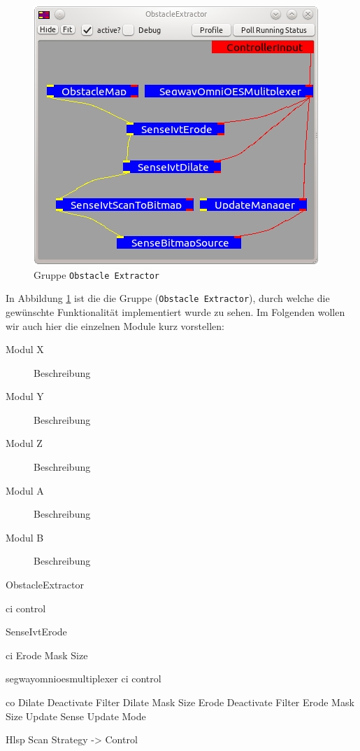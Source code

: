 \begin{figure}[h]
\center
\includegraphics[scale=0.8]{graphics/ObstacleExtractor.jpg}
\caption{\label{fig:obstacleExtractor} Gruppe \lstinline{Obstacle Extractor}}
\end{figure}
 In Abbildung \ref{fig:obstacleExtractor} ist die die Gruppe
 (\lstinline{Obstacle Extractor}), durch welche die gewünschte Funktionalität implementiert wurde zu sehen.
 Im Folgenden wollen wir auch hier die einzelnen Module kurz vorstellen:


\begin{description}
\item[Modul X] Beschreibung
\item[Modul Y] Beschreibung
\item[Modul Z] Beschreibung
\item[Modul A] Beschreibung
\item[Modul B] Beschreibung
\end{description}
ObstacleExtractor

ci control


SenseIvtErode

ci Erode Mask Size


segwayomnioesmultiplexer
ci control

co Dilate Deactivate Filter
Dilate Mask Size
Erode Deactivate Filter
Erode Mask Size
Update
Sense Update Mode

Hlsp Scan Strategy -> Control
